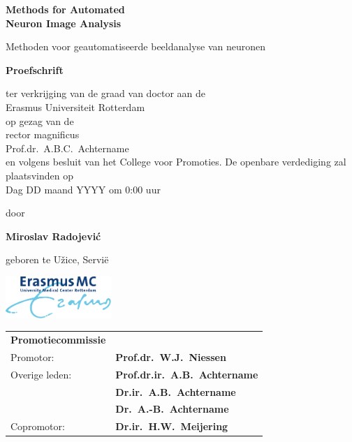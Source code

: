 %
%

\setlength{\parindent}{0pt}
\thispagestyle{empty}

\begin{center}
  
  \vspace*{5mm}
  {\huge\bf Methods for Automated\\[0.3ex] Neuron Image Analysis\\}

  \vfill
  \vfill
  \vfill

  {\large Methoden voor geautomatiseerde beeldanalyse van neuronen\\[1ex]}


  \vfill
  \vfill
  \vfill
  \vfill

  {\large\bf Proefschrift}
  {\large 
  \vfill
  \vfill
  
  \normalsize
  
  ter verkrijging van de graad van doctor aan de \\Erasmus Universiteit Rotterdam\\
op gezag van de \\rector magnificus\\
  \vfill
Prof.dr.~A.B.C.~Achtername\\
  \vfill
en volgens besluit van het College voor Promoties. 
  \vfill
De openbare verdediging zal plaatsvinden op \\Dag DD maand YYYY om 0:00 uur
  
  
  \vfill
  \vfill
  
  \large
  door}

  \vfill
  \vfill
  \vfill

  {\large\bf Miroslav Radojevi\'{c}}

  \vfill

  {\large geboren te U\v{z}ice, Servi{\"e}}

  \vfill
  \vfill
\includegraphics[width=0.3\textwidth]{./logos/emc1}
\end{center}


\newpage
\thispagestyle{empty}
\label{othersideformal}

\begin{tabular}{@{}ll@{}}
\large\bf{Promotiecommissie} &\\ [8ex]
Promotor:    & {\bf Prof.dr.~W.J.~Niessen}\\[3ex]
Overige leden: & {\bf Prof.dr.ir.~A.B.~Achtername}\\[1ex]
&{\bf Dr.ir.~A.B.~Achtername}\\[1ex]
&{\bf Dr.~A.-B.~Achtername}\\[3ex]
Copromotor: & {\bf Dr.ir.~H.W.~Meijering}\\
\end{tabular}